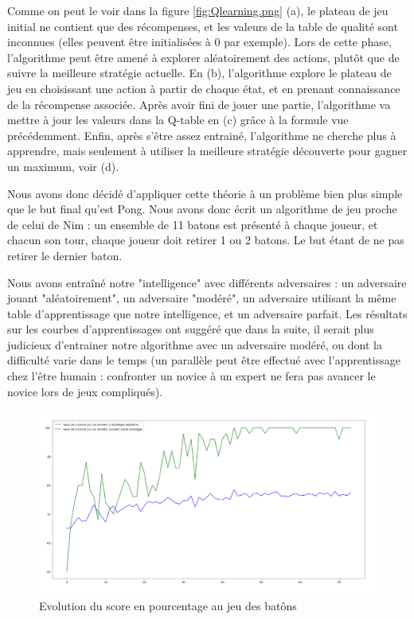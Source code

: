 \documentclass[
    10pt,
    a4paper,
    oneside,
    headinclude,footinclude,
    BCOR=5mm,
    captions=tableabove
]{scrartcl}
\begin{document}
Comme on peut le voir dans la figure \ref{fig:Qlearning.png} (a), le plateau de jeu initial ne contient que des récompenses, et les valeurs de la table de qualité sont inconnues (elles peuvent être initialisées à 0 par exemple). Lors de cette phase, l'algorithme peut être amené à explorer aléatoirement des actions, plutôt que de suivre la meilleure stratégie actuelle.
En (b), l'algorithme explore le plateau de jeu en choisissant une action à partir de chaque état, et en prenant connaissance de la récompense associée.
Après avoir fini de jouer une partie, l'algorithme va mettre à jour les valeurs dans la Q-table en (c) grâce à la formule vue précédemment.
Enfin, après s'être assez entrainé, l'algorithme ne cherche plus à apprendre, mais seulement à utiliser la meilleure stratégie découverte pour gagner un maximum, voir (d).

Nous avons donc décidé d'appliquer cette théorie  à un problème bien plus simple que le but final qu'est Pong. Nous avons donc écrit un algorithme de jeu proche de celui de Nim : un ensemble de 11 batons est présenté à chaque joueur, et chacun son tour, chaque joueur doit retirer 1 ou 2 batons. Le but étant de ne pas retirer le dernier baton.

Nous avons entraîné notre "intelligence" avec différents adversaires : un adversaire jouant "aléatoirement", un adversaire "modéré", un adversaire utilisant la même table d'apprentissage que notre intelligence, et un adversaire parfait. Les résultats sur les courbes d'apprentissages ont suggéré que dans la suite, il serait plus judicieux d'entrainer notre algorithme avec un adversaire modéré, ou dont la difficulté varie dans le temps (un parallèle peut être effectué avec l'apprentissage chez l'être humain : confronter un novice à un expert ne fera pas avancer le novice lors de jeux compliqués).

\begin{figure}
\includegraphics[width=\linewidth]{batons-victory.png}
\centering
\caption{Evolution du score en pourcentage au jeu des batôns}
\label{fig:batons.png}
\end{figure}
\end{document}
